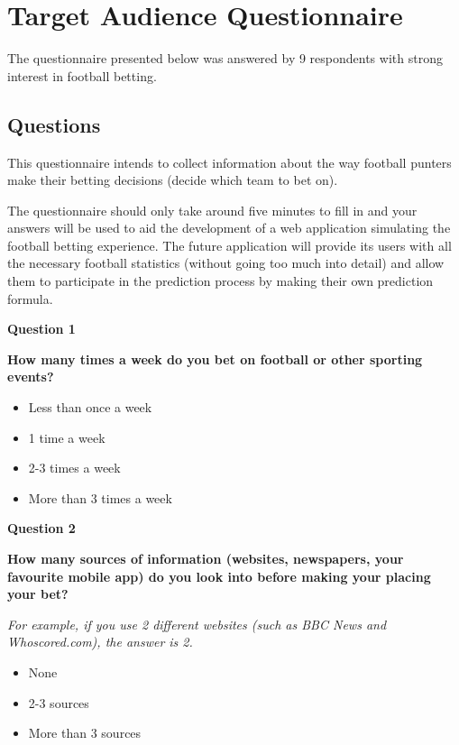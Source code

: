 \chapter{Target Audience Questionnaire}
\label{ch:ta_questionnaire_appendix}
The questionnaire presented below was answered by 9 respondents with strong interest in football betting. 

\section{Questions}
\label{sec:ta_questions_appendix}
This questionnaire intends to collect information about the way football punters make their betting decisions (decide which team to bet on).

The questionnaire should only take around five minutes to fill in and your answers will be used to aid the development of a web application simulating the football betting experience. The future application will provide its users with all the necessary football statistics (without going too much into detail) and allow them to participate in the prediction process by making their own prediction formula. 

\textbf{Question 1}\par
\textbf{How many times a week do you bet on football or other sporting events?}
\begin{itemize}
	\item Less than once a week
	\item 1 time a week
	\item 2-3 times a week
 	\item More than 3 times a week
 \end{itemize}
 
\textbf{Question 2}\par
\textbf{How many sources of information (websites, newspapers, your favourite mobile app) do you look into before making your placing your bet?}\par
\emph{For example, if you use 2 different websites (such as BBC News and Whoscored.com), the answer is 2.}
 \begin{itemize}
 	\item None
 	\item 2-3 sources
 	\item More than 3 sources
 \end{itemize}
 

